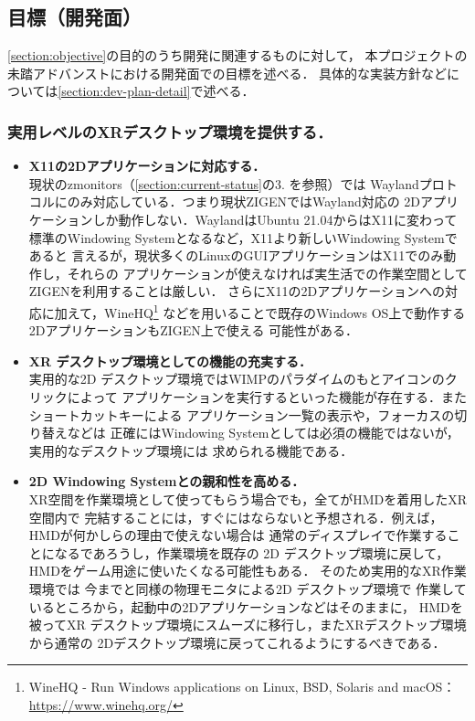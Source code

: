 \subsection{目標（開発面）}
\label{section:dev-goal}

\ref*{section:objective}の目的のうち開発に関連するものに対して，
本プロジェクトの未踏アドバンストにおける開発面での目標を述べる．
具体的な実装方針などについては\ref{section:dev-plan-detail}で述べる．

\subsubsection*{実用レベルのXRデスクトップ環境を提供する．}

\begin{itemize}
  \item \textbf{X11の2Dアプリケーションに対応する．}\\
        現状のzmonitors（\ref{section:current-status}の3. を参照）では %
        Waylandプロトコルにのみ対応している．つまり現状ZIGENではWayland対応の
        2Dアプリケーションしか動作しない．WaylandはUbuntu 21.04からはX11に変わって
        標準のWindowing Systemとなるなど，X11より新しいWindowing Systemであると
        言えるが，現状多くのLinuxのGUIアプリケーションはX11でのみ動作し，それらの
        アプリケーションが使えなければ実生活での作業空間としてZIGENを利用することは厳しい．
        さらにX11の2Dアプリケーションへの対応に加えて，WineHQ\footnote{WineHQ - Run Windows applications on Linux, BSD, Solaris and macOS：\url{https://www.winehq.org/}}
        などを用いることで既存のWindows OS上で動作する2DアプリケーションもZIGEN上で使える
        可能性がある．

  \item \textbf{XR デスクトップ環境としての機能の充実する．}\\
        実用的な2D デスクトップ環境ではWIMPのパラダイムのもとアイコンのクリックによって
        アプリケーションを実行するといった機能が存在する．またショートカットキーによる
        アプリケーション一覧の表示や，フォーカスの切り替えなどは
        正確にはWindowing Systemとしては必須の機能ではないが，実用的なデスクトップ環境には
        求められる機能である．

  \item \textbf{2D Windowing Systemとの親和性を高める．}\\
        XR空間を作業環境として使ってもらう場合でも，全てがHMDを着用したXR空間内で
        完結することには，すぐにはならないと予想される．例えば，HMDが何かしらの理由で使えない場合は
        通常のディスプレイで作業することになるであろうし，作業環境を既存の
        2D デスクトップ環境に戻して，HMDをゲーム用途に使いたくなる可能性もある．
        そのため実用的なXR作業環境では 今までと同様の物理モニタによる2D デスクトップ環境で
        作業しているところから，起動中の2Dアプリケーションなどはそのままに，
        HMDを被ってXR デスクトップ環境にスムーズに移行し，またXRデスクトップ環境から通常の
        2Dデスクトップ環境に戻ってこれるようにするべきである．
\end{itemize}


